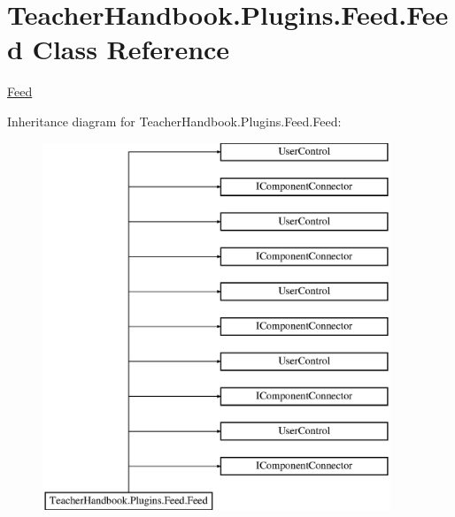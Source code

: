 \hypertarget{class_teacher_handbook_1_1_plugins_1_1_feed_1_1_feed}{}\section{Teacher\+Handbook.\+Plugins.\+Feed.\+Feed Class Reference}
\label{class_teacher_handbook_1_1_plugins_1_1_feed_1_1_feed}


\mbox{\hyperlink{class_teacher_handbook_1_1_plugins_1_1_feed_1_1_feed}{Feed}}  


Inheritance diagram for Teacher\+Handbook.\+Plugins.\+Feed.\+Feed\+:\begin{figure}[H]
\begin{center}
\leavevmode
\includegraphics[height=11.000000cm]{d2/d56/class_teacher_handbook_1_1_plugins_1_1_feed_1_1_feed}
\end{center}
\end{figure}

